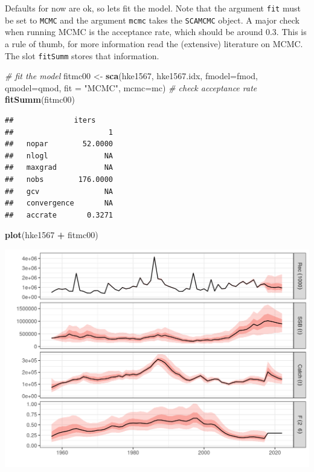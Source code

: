 \documentclass[
]{book}
\newenvironment{Shaded}{\begin{snugshade}}{\end{snugshade}}
\newcommand{\AttributeTok}[1]{\textcolor[rgb]{0.13,0.29,0.53}{#1}}
\newcommand{\CommentTok}[1]{\textcolor[rgb]{0.56,0.35,0.01}{\textit{#1}}}
\newcommand{\FunctionTok}[1]{\textcolor[rgb]{0.13,0.29,0.53}{\textbf{#1}}}
\newcommand{\NormalTok}[1]{#1}
\newcommand{\OtherTok}[1]{\textcolor[rgb]{0.56,0.35,0.01}{#1}}
\newcommand{\SpecialCharTok}[1]{\textcolor[rgb]{0.81,0.36,0.00}{\textbf{#1}}}
\newcommand{\StringTok}[1]{\textcolor[rgb]{0.31,0.60,0.02}{#1}}
\begin{document}
Defaults for now are ok, so lets fit the model. Note that the argument \texttt{fit} must be set to \texttt{MCMC} and the argument \texttt{mcmc} takes the \texttt{SCAMCMC} object. A major check when running MCMC is the acceptance rate, which should be around 0.3. This is a rule of thumb, for more information read the (extensive) literature on MCMC. The slot \texttt{fitSumm} stores that information.

\begin{Shaded}
\begin{Highlighting}[]
\CommentTok{\# fit the model}
\NormalTok{fitmc00 }\OtherTok{\textless{}{-}} \FunctionTok{sca}\NormalTok{(hke1567, hke1567.idx, }\AttributeTok{fmodel=}\NormalTok{fmod, }\AttributeTok{qmodel=}\NormalTok{qmod, }\AttributeTok{fit =} \StringTok{"MCMC"}\NormalTok{, }\AttributeTok{mcmc=}\NormalTok{mc)}
\CommentTok{\# check acceptance rate}
\FunctionTok{fitSumm}\NormalTok{(fitmc00)}
\end{Highlighting}
\end{Shaded}

\begin{verbatim}
##              iters
##                      1
##   nopar        52.0000
##   nlogl             NA
##   maxgrad           NA
##   nobs        176.0000
##   gcv               NA
##   convergence       NA
##   accrate       0.3271
\end{verbatim}

\begin{Shaded}
\begin{Highlighting}[]
\FunctionTok{plot}\NormalTok{(hke1567 }\SpecialCharTok{+}\NormalTok{ fitmc00)}
\end{Highlighting}
\end{Shaded}

\includegraphics{_bookdown_files/_main_files/figure-html/unnamed-chunk-119-1.png}
\end{document}
